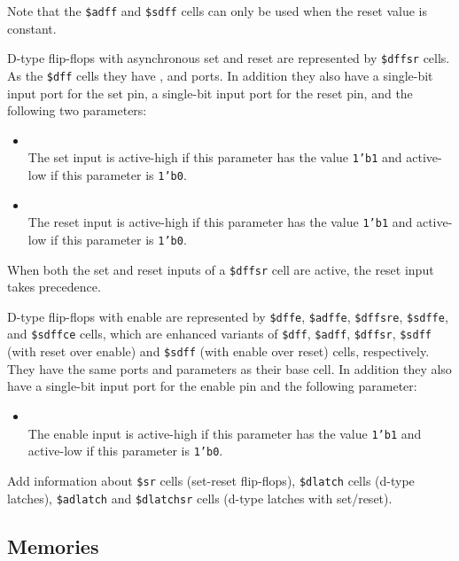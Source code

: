 Note that the {\tt \$adff} and {\tt \$sdff} cells can only be used when the reset value is constant.

D-type flip-flops with asynchronous set and reset are represented by {\tt \$dffsr} cells.
As the {\tt \$dff} cells they have ,  and  ports. In addition they also have
a single-bit  input port for the set pin, a single-bit  input port for the reset pin,
and the following two parameters:

\begin{itemize}
\item {} \\
The set input is active-high if this parameter has the value {\tt 1'b1} and active-low
if this parameter is {\tt 1'b0}.

\item {} \\
The reset input is active-high if this parameter has the value {\tt 1'b1} and active-low
if this parameter is {\tt 1'b0}.
\end{itemize}

When both the set and reset inputs of a {\tt \$dffsr} cell are active, the reset input takes
precedence.

D-type flip-flops with enable are represented by {\tt \$dffe}, {\tt \$adffe}, {\tt \$dffsre},
{\tt \$sdffe}, and {\tt \$sdffce} cells, which are enhanced variants of {\tt \$dff}, {\tt \$adff}, {\tt \$dffsr},
{\tt \$sdff} (with reset over enable) and {\tt \$sdff} (with enable over reset)
cells, respectively.  They have the same ports and parameters as their base cell.
In addition they also have a single-bit  input port for the enable pin and the following parameter:

\begin{itemize}
\item {} \\
The enable input is active-high if this parameter has the value {\tt 1'b1} and active-low
if this parameter is {\tt 1'b0}.
\end{itemize}

\begin{fixme}
Add information about {\tt \$sr} cells (set-reset flip-flops), {\tt \$dlatch} cells (d-type latches),
{\tt \$adlatch} and {\tt \$dlatchsr} cells (d-type latches with set/reset).
\end{fixme}

\subsection{Memories}
\label{sec:memcells}


